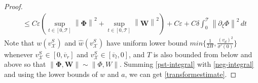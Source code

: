 \documentclass[12pt,reqno]{amsart}
\numberwithin{equation}{section}
\newcommand{\norm}[1]{\left\lVert #1 \right\rVert}
\def\p{\partial}
\def\T{\mathcal{T}}
\def\phh{\hat{\mathbf{\Phi}}}
\def\whh{\hat{\mathbf{W}}}
\def\th{\hat{T}}
\def\wh{\hat{w}}
\def\supt{\mathop{sup}\limits_{t \in [0,\mathcal{T}]}}
\def\ph{\mathbf{\Phi}}
\def\w{\mathbf{W}}
\def\vsx{v^S_{\mathcal{X}}}
\def\avl{\overline{v}_l}
\def\avr{\overline{v}_r}
\def\X{\mathcal{X}}
\begin{document}
\begin{proof}
\begin{equation}
\begin{aligned}
			&\leq C\varepsilon(\supt\norm{\ph}^2+\supt\norm{\w}^2)+C\varepsilon+C\delta\int_{0}^{\T}\norm{\p_{\xi}\Phi}^2\,dt
		\end{aligned}
	\end{equation}
	Note that $w(\vsx)$ and $\wh(\vsx)$ have uniform lower bound $min\big\{\frac{1}{2H},\frac{(v_d)^2}{\sigma'(0)}\big\}$ whenever $\vsx \in [0,\avr]$ and $\vsx \in [\avl,0]$, and $T$ is also bounded from below and above so that $\norm{\ph,\w} \sim \norm{\Phi,W}$.  Summing \eqref{pst-integral} with \eqref{neg-integral} and using the lower bounds of $w$ and $a$, we can get \eqref{transformestimate}.
%	
%	
%	
\end{proof}
\end{document}
